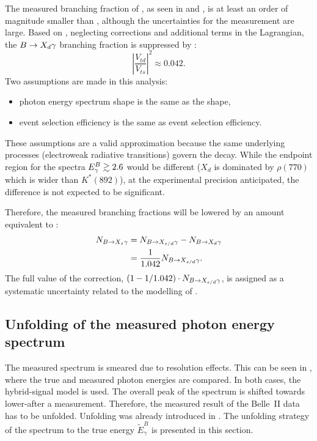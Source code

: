 The measured branching fraction of \BtoXdgamma, 
as seen in  and , is at least an order of magnitude smaller than \BtoXsgamma,
although the uncertainties for the measurement are large.
Based on , neglecting corrections and additional terms in the Lagrangian, the $\BtoXdgamma$ branching fraction
is suppressed by \cite{Workman:2022ynf}:
\begin{equation}\label{eq:btodgamma_suppression}
    \left|\frac{V_{td}}{V_{ts}}\right|^2 \approx 0.042.
\end{equation}
Two assumptions are made in this analysis:
\begin{itemize}
    \item \BtoXdgamma photon energy spectrum shape is the same as the \BtoXsgamma shape,
    \item \BtoXdgamma event selection efficiency is the same as \BtoXsgamma event selection efficiency.
\end{itemize}
These assumptions are a valid approximation because the same underlying processes (electroweak radiative transitions) govern the decay.
While the endpoint region for the spectra ${E^B_{\gamma}}\gtrsim2.6$ would be different  ($X_d$ is dominated by $\rho(770)$ 
which is wider than $K^*(892)$), at the experimental precision anticipated, the difference is not expected to be significant.

Therefore, the measured \BtoXsdgamma branching fractions will be lowered by an amount equivalent to :
\begin{align}\label{eq:btodgamma_subtraction}
    \begin{split}
    N_{\BtoXsgamma} &= N_{\BtoXsdgamma} - N_{\BtoXdgamma}\\
                    &=\frac{1}{1.042} N_{\BtoXsdgamma}.
    \end{split}
\end{align}
The full value of the correction, $(1-1/1.042) \cdot N_{\BtoXsdgamma}$, is assigned as a systematic uncertainty related to the modelling of \BtoXdgamma.

\subsection{Unfolding of the measured photon energy spectrum} \label{sec:signal_unfolding}

The measured \EB spectrum is smeared due to resolution effects.
This can be seen in , where the true and measured photon energies are compared.
In both cases, the hybrid-signal model is used.
The overall peak of the spectrum is shifted towards lower-\EB after a measurement.
Therefore, the measured result of the Belle~II data has to be unfolded.
Unfolding was already introduced in .
The unfolding strategy of the \EB spectrum to the true energy $\tilde{E}_{\gamma}^B$ is presented in this section.

